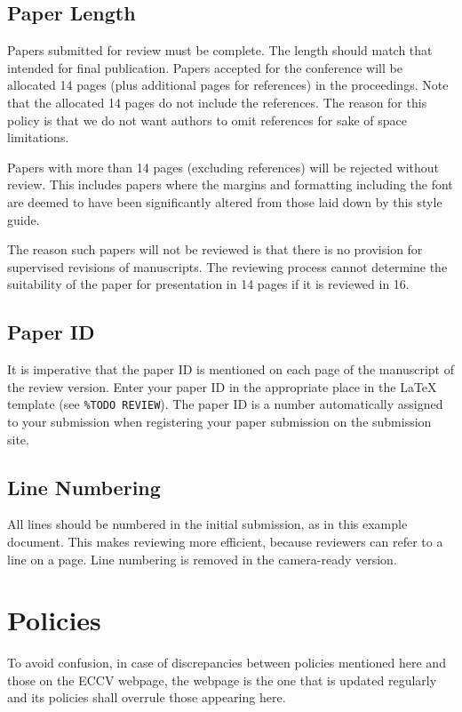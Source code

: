 \documentclass[runningheads]{llncs}
\begin{document}
\subsection{Paper Length}
Papers submitted for review must be complete. 
The length should match that intended for final publication. 
Papers accepted for the conference will be allocated 14 pages (plus additional pages for references) in the proceedings. 
Note that the allocated 14 pages do not include the references. 
The reason for this policy is that we do not want authors to omit references for sake of space limitations.

Papers with more than 14 pages (excluding references) will be rejected without review.
This includes papers where the margins and formatting including the font are deemed to have been significantly altered from those laid down by this style guide.

The reason such papers will not be reviewed is that there is no provision for supervised revisions of manuscripts. 
The reviewing process cannot determine the suitability of the paper for presentation in 14 pages if it is reviewed in 16.


\subsection{Paper ID}
It is imperative that the paper ID is mentioned on each page of the manuscript of the review version.
Enter your paper ID in the appropriate place in the \LaTeX{} template (see \texttt{\%TODO REVIEW}).
The paper ID is a number automatically assigned to your submission when registering your paper submission on the submission site.


\subsection{Line Numbering}
\label{sec:line-numbering}
All lines should be numbered in the initial submission, as in this example document. 
This makes reviewing more efficient, because reviewers can refer to a line on a page. 
Line numbering is removed in the camera-ready version.


\section{Policies}
To avoid confusion, in case of discrepancies between policies mentioned here and those on the ECCV \ECCVyear{} webpage, the webpage is the one that is updated regularly and its policies shall overrule those appearing here. 
\end{document}
